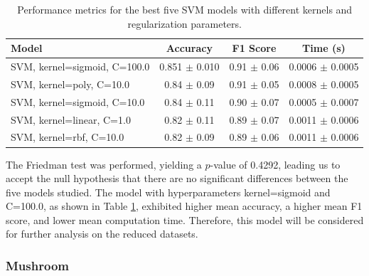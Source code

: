 \begin{table}[h!]
\centering
\begin{tabular}{|l|c|c|c|}
\hline
\textbf{Model} & \textbf{Accuracy} & \textbf{F1 Score} & \textbf{Time (s)} \\
\hline
SVM, kernel=sigmoid, C=100.0 & 0.851 $\pm$ 0.010 & 0.91 $\pm$ 0.06 & 0.0006 $\pm$ 0.0005 \\
\hline
SVM, kernel=poly, C=10.0     & 0.84 $\pm$ 0.09 & 0.91 $\pm$ 0.05 & 0.0008 $\pm$ 0.0005 \\
\hline
SVM, kernel=sigmoid, C=10.0  & 0.84 $\pm$ 0.11 & 0.90 $\pm$ 0.07 & 0.0005 $\pm$ 0.0007 \\
\hline
SVM, kernel=linear, C=1.0    & 0.82 $\pm$ 0.11 & 0.89 $\pm$ 0.07 & 0.0011 $\pm$ 0.0006 \\
\hline
SVM, kernel=rbf, C=10.0      & 0.82 $\pm$ 0.09 & 0.89 $\pm$ 0.06 & 0.0011 $\pm$ 0.0006 \\
\hline
\end{tabular}
\caption{Performance metrics for the best five SVM models with different kernels and regularization parameters.}
\label{tab:svm_metrics}
\end{table}

The Friedman test was performed, yielding a $p$-value of 0.4292, leading us to accept the null hypothesis that there are no significant differences between the five models studied. The model with hyperparameters kernel=sigmoid and C=100.0, as shown in Table \ref{tab:svm_metrics}, exhibited higher mean accuracy, a higher mean F1 score, and lower mean computation time. Therefore, this model will be considered for further analysis on the reduced datasets.

\subsubsection{Mushroom}
